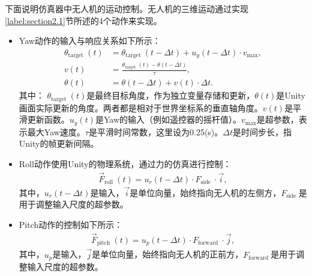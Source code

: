 下面说明仿真器中无人机的运动控制。无人机的三维运动通过实现\ref{label:section2.1}节所述的4个动作来实现。

\begin{itemize}
    \item Yaw动作的输入与响应关系如下所示：
          \begin{equation}
              \begin{aligned}
                  \theta_{\text {target }}(t) & =\theta_{\text {target }}(t-\Delta t)+u_y(t-\Delta t) \cdot v_{\max }, \\
                  v(t)                        & =\frac{\theta_{\text {target }}(t)-\theta(t-\Delta t)}{\tau},          \\
                  \theta(t)                   & =\theta(t-\Delta t)+v(t) \cdot \Delta t .
              \end{aligned}
          \end{equation}
          其中：
          $\theta_{\text {target }}(t)$是最终目标角度，作为独立变量存储和更新，$\theta(t)$是Unity画面实际更新的角度。两者都是相对于世界坐标系的垂直轴角度。$v(t)$是平滑更新函数。$u_y(t)$是Yaw的输入（例如遥控器的摇杆值）。$v_{\max }$是超参数，表示最大Yaw速度。$\tau$是平滑时间常数，这里设为0.25(s)。$\Delta t$是时间步长，指Unity的帧更新间隔。
\end{itemize}

\begin{itemize}
    \item Roll动作使用Unity的物理系统，通过力的仿真进行控制：
          \begin{equation}
              \begin{gathered}
                  \vec{F}_{\text {roll }}(t)=u_r(t-\Delta t) \cdot F_{\text {side }} \cdot \vec{i},
              \end{gathered}
          \end{equation}
          其中，$u_r(t-\Delta t)$是输入，$\Vec{i}$是单位向量，始终指向无人机的左侧方，$F_{\text {side }}$是用于调整输入尺度的超参数。
\end{itemize}

\begin{itemize}
    \item Pitch动作的控制如下所示：
          \begin{equation}
              \begin{gathered}
                  \vec{F}_{\text {pitch }}(t)=u_p(t-\Delta t) \cdot F_{\text {forward }} \cdot \vec{j},
              \end{gathered}
          \end{equation}
          其中，$u_p$是输入，$\Vec{j}$是单位向量，始终指向无人机的正前方，$F_{\text {forward }}$是用于调整输入尺度的超参数。
\end{itemize}

